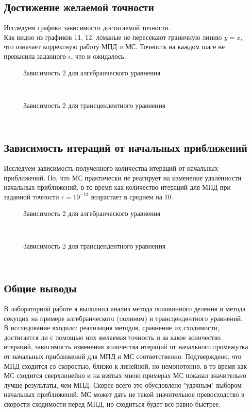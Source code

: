 \documentclass[12pt]{article}
\begin{document}
\subsection{Достижение желаемой точности}
Исследуем графики зависимости достигаемой точности.\\
Как видно из графиков 11, 12, ломаные не пересекают граничную линию $y=x$, что означает корректную работу МПД и МС. Точность на каждом шаге не превысила заданного $\epsilon$, что и ожидалось.\\
\begin{figure}[h!]
\caption{Зависимость 2 для алгебраического уравнения}
\label{fig:Зависимость 2 для алгебраического уравнения}
\end{figure}\\
\begin{figure}[h!]
\caption{Зависимость 2 для трансцендентного уравнения}
\label{fig:Зависимость 2 для трансцендентного уравнения}
\end{figure}\\
\newpage
\subsection{Зависимость итераций от начальных приближений}
Исследуем зависимость полученного количества итераций от начальных приближений. По, что МС практически не реагирует на изменение удалённости начальных приближений, в то время как количество итераций для МПД при заданной точности $\epsilon = 10^{-12}$ возрастает в среднем на 10.
\begin{figure}[h!]
\caption{Зависимость 2 для алгебраического уравнения}
\label{fig:Зависимость 2 для алгебраического уравнения}
\end{figure}\\
\begin{figure}[h!]
\caption{Зависимость 2 для трансцендентного уравнения}
\label{fig:Зависимость 2 для трансцендентного уравнения}
\end{figure}\\
\newpage
\subsection{Общие выводы}
В лабораторной работе я выполнил анализ метода половинного деления и метода секущих на примере алгебраического (полином) и трансцендентного уравнений.\\
В исследование входило: реализация методов, сравнение их сходимости, достигается ли с помощью них желаемая точность и за какое количество итераций, зависимость изменения количества итераций от начального промежутка от начальных приближений для МПД и МС соответственно. Подтверждено, что МПД сходится со скоростью, близко к линейной, но немонотонно, в то время как МС сходится сверхлинейно и на взятых мною примерах МС показал значительно лучше результаты, чем МПД. Скорее всего это обусловлено "удачным" выбором начальных приближений. МС может дать не такой значительное превосходство в скорости сходимости перед МПД, но сходиться будет всё равно быстрее.
\end{document}
